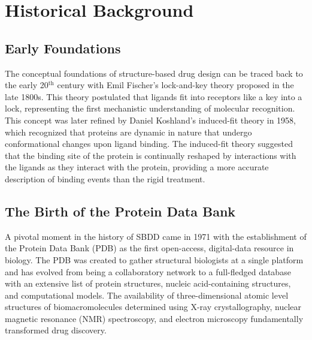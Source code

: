 \documentclass[12pt, a4paper]{article}
\begin{document}
\section{Historical Background}

\subsection{Early Foundations}
The conceptual foundations of structure-based drug design can be traced back to the early 20$^{\text{th}}$ century with Emil Fischer’s lock-and-key theory proposed in the late 1800s\cite{CH1_1}. This theory postulated that ligands fit into receptors like a key into a lock, representing the first mechanistic understanding of molecular recognition. This concept was later refined by Daniel Koshland’s induced-fit theory in 1958\cite{CH1_2}, which recognized that proteins are dynamic in nature that undergo conformational changes upon ligand binding. The induced-fit theory suggested that the binding site of the protein is continually reshaped by interactions with the ligands as they interact with the protein, providing a more accurate description of binding events than the rigid treatment.

\subsection{The Birth of the Protein Data Bank}
A pivotal moment in the history of SBDD came in 1971 with the establishment of the Protein Data Bank (PDB) as the first open-access, digital-data resource in biology\cite{CH1_3}. The PDB was created to gather structural biologists at a single platform and has evolved from being a collaboratory network to a full-fledged database with an extensive list of protein structures, nucleic acid-containing structures, and computational models. The availability of three-dimensional atomic level structures of biomacromolecules determined using X-ray crystallography, nuclear magnetic resonance (NMR) spectroscopy, and electron microscopy fundamentally transformed drug discovery.
\end{document}
